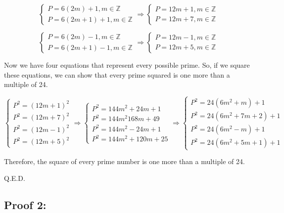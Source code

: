 \[
  \begin{cases}
    P = 6(2m) + 1, m \in \mathbb{Z} \\
    P = 6(2m + 1) + 1, m \in \mathbb{Z}
  \end{cases} \Longrightarrow \begin{cases}
    P = 12m + 1, m \in \mathbb{Z} \\
    P = 12m + 7, m \in \mathbb{Z}
  \end{cases}
\]

\[
  \begin{cases}
    P = 6(2m) - 1, m \in \mathbb{Z} \\
    P = 6(2m + 1) - 1, m \in \mathbb{Z}
  \end{cases} \Longrightarrow \begin{cases}
    P = 12m - 1, m \in \mathbb{Z} \\
    P = 12m + 5, m \in \mathbb{Z}
  \end{cases}
\]

Now we have four equations that represent every possible prime. So, if we square these equations, we can show that every prime squared is one more than a multiple of 24.

\[
    \begin{cases}
        P^2 = {(12m + 1)}^2 \\
        P^2 = {(12m + 7)}^2 \\
        P^2 = {(12m - 1)}^2 \\
        P^2 = {(12m + 5)}^2
    \end{cases} \Longrightarrow \begin{cases}
        P^2 = 144m^2 + 24m + 1 \\
        P^2 = 144m^2 168m + 49 \\
        P^2 = 144m^2 - 24m + 1 \\
        P^2 = 144m^2 + 120m + 25
    \end{cases} \Longrightarrow \begin{cases}
        P^2 = 24(6m^2 + m) + 1 \\
        P^2 = 24(6m^2 + 7m + 2) + 1 \\
        P^2 = 24(6m^2 - m) + 1 \\
        P^2 = 24(6m^2 + 5m + 1) + 1
    \end{cases}
\]

Therefore, the square of every prime number is one more than a multiple of 24. 

Q.E.D.

\subsection*{Proof 2:}

